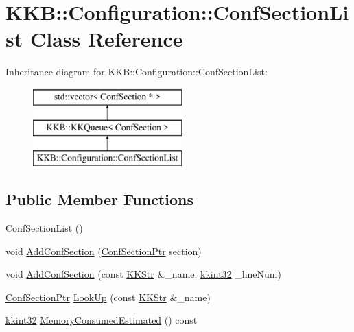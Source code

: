 \hypertarget{class_k_k_b_1_1_configuration_1_1_conf_section_list}{}\section{K\+KB\+:\+:Configuration\+:\+:Conf\+Section\+List Class Reference}
\label{class_k_k_b_1_1_configuration_1_1_conf_section_list}
Inheritance diagram for K\+KB\+:\+:Configuration\+:\+:Conf\+Section\+List\+:\begin{figure}[H]
\begin{center}
\leavevmode
\includegraphics[height=3.000000cm]{class_k_k_b_1_1_configuration_1_1_conf_section_list}
\end{center}
\end{figure}
\subsection*{Public Member Functions}
\begin{DoxyCompactItemize}
\item 
\hyperlink{class_k_k_b_1_1_configuration_1_1_conf_section_list_afd97efa550cb4e9fbe987e2a43882e66}{Conf\+Section\+List} ()
\item 
void \hyperlink{class_k_k_b_1_1_configuration_1_1_conf_section_list_a4cb1a372299d3e5b6c306644bb465fd6}{Add\+Conf\+Section} (\hyperlink{class_k_k_b_1_1_configuration_1_1_conf_section}{Conf\+Section\+Ptr} section)
\item 
void \hyperlink{class_k_k_b_1_1_configuration_1_1_conf_section_list_af2883f2a6313bf9c2c90b2fd34fc3de9}{Add\+Conf\+Section} (const \hyperlink{class_k_k_b_1_1_k_k_str}{K\+K\+Str} \&\+\_\+name, \hyperlink{namespace_k_k_b_a8fa4952cc84fda1de4bec1fbdd8d5b1b}{kkint32} \+\_\+line\+Num)
\item 
\hyperlink{class_k_k_b_1_1_configuration_1_1_conf_section}{Conf\+Section\+Ptr} \hyperlink{class_k_k_b_1_1_configuration_1_1_conf_section_list_ae1932c42a5b475020b4f84e5f36fcba6}{Look\+Up} (const \hyperlink{class_k_k_b_1_1_k_k_str}{K\+K\+Str} \&\+\_\+name)
\item 
\hyperlink{namespace_k_k_b_a8fa4952cc84fda1de4bec1fbdd8d5b1b}{kkint32} \hyperlink{class_k_k_b_1_1_configuration_1_1_conf_section_list_aab5e7968237c965d19a3dc8feb280b79}{Memory\+Consumed\+Estimated} () const 
\end{DoxyCompactItemize}
